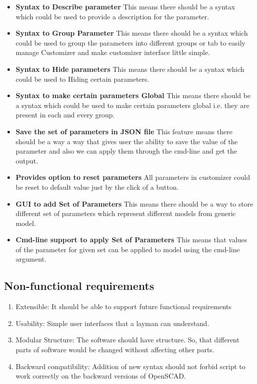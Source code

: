 \begin{itemize}
\begin{enumerate}
    \end{enumerate}
    \item {\bf Syntax to Describe parameter}
        This means there should be a syntax which could be used to provide a description for the parameter.
    \item \textbf{Syntax to Group Parameter}
        This means there should be a syntax which could be used to group the parameters into different groups or tab to easily manage Customizer and make customizer interface little simple.
    \item \textbf{Syntax to Hide parameters}
        This means there should be a syntax which could be used to Hiding certain parameters.
    \item \textbf{Syntax to make certain parameters Global}
        This means there should be a syntax which could be used to make certain parameters global i.e. they are present in each and every group.
    \item \textbf{Save the set of parameters in JSON file}
    This feature means there should be a way a way that gives user the ability to save the value of the parameter and also we can apply them through the cmd-line and get the output.
	
	\item\textbf{Provides option to reset parameters} All parameters in customizer could be reset to
	default value just by the click of a button.
    \item \textbf{GUI to add Set of Parameters}
        This means there should be a way to store different set of parameters which represent different models from generic model.
  \item \textbf{ Cmd-line support to apply Set of Parameters} This means that values of
    the parameter for given set can be applied to model using the cmd-line argument.
    \end{itemize}
\subsection{Non-functional requirements}
\begin{enumerate}
    \item Extensible: It should be able to support future functional requirements
    \item Usability: Simple user interfaces that a layman can understand.
    \item Modular Structure: The software should have  structure. So, that different parts of software would be changed without affecting other parts.
    \item Backward compatibility: Addition of new syntax should not forbid script to work correctly on the backward versions of OpenSCAD.
\end{enumerate}

